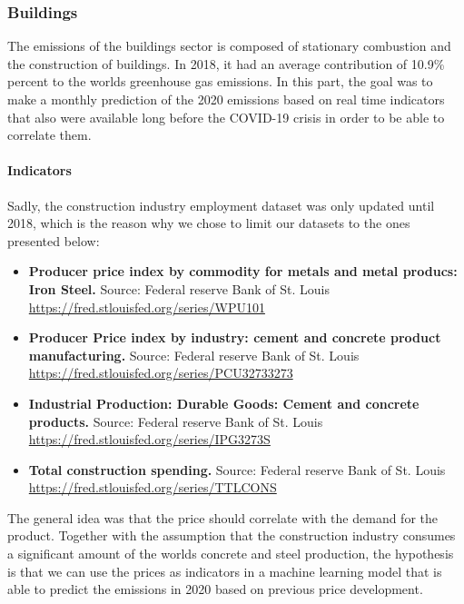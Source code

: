 \subsubsection{Buildings}
The emissions of the buildings sector is composed of stationary combustion and the construction of buildings. In 2018, it had an average contribution of 10.9\%
percent to the worlds greenhouse gas emissions. 
In this part, the goal was to make a monthly prediction of the 2020 emissions based on real time indicators that also were available long before the COVID-19 crisis in order to be able to correlate them.

\paragraph{Indicators}

Sadly, the construction industry employment dataset was only updated until 2018, which is the reason why we chose to limit our datasets to the ones presented below:

\begin{itemize}
	\item \textbf{Producer price index by commodity for metals and metal producs: Iron Steel.}
	Source: Federal reserve Bank of St. Louis
	\url{https://fred.stlouisfed.org/series/WPU101}
	\item \textbf{Producer Price index by industry: cement and concrete product manufacturing.}
	Source:  Federal reserve Bank of St. Louis
	\url{https://fred.stlouisfed.org/series/PCU32733273}
	\item \textbf{Industrial Production: Durable Goods: Cement and concrete products.}
	Source:  Federal reserve Bank of St. Louis
	\url{https://fred.stlouisfed.org/series/IPG3273S}
	\item \textbf{Total construction spending.}
	Source:  Federal reserve Bank of St. Louis
	\url{https://fred.stlouisfed.org/series/TTLCONS}
\end{itemize}%

The general idea was that the price should correlate with the demand for the product. Together with the assumption that the construction industry consumes a significant amount of the worlds concrete and steel production, the hypothesis is that we can use the prices as indicators in a machine learning model that is able to predict the emissions in 2020 based on previous price development.

